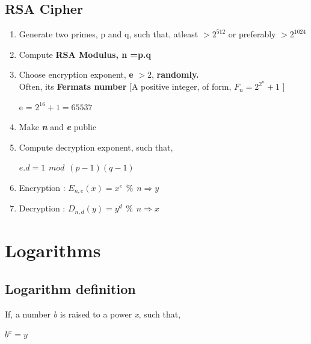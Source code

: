 \documentclass[12pt]{article}
\begin{document}
\subsection{RSA Cipher}
\begin{enumerate}
\item Generate two primes, p and q, such that, atleast $>2^{512}$ or preferably $>2^{1024}$
\item Compute \textbf{RSA Modulus, n =p.q}
\item Choose encryption exponent, \textbf{e} $> 2$, \textbf{randomly.} \\
Often, its \textbf{Fermats number} [A positive integer, of form, \textbf{$F_{n}=2^{2^{n}} + 1$} ]\\
\begin{center}
e = $2^{16} +1 = 65537$
\end{center}
\item Make \textbf{\textit{n}} and \textbf{\textit{e}} public
\item Compute decryption exponent, such that,\\
\begin{center}
$e.d = 1 \hspace{5pt} mod \hspace{5pt} (p-1)(q-1)$
\end{center}
\item Encryption : $E_{n,e}(x) = x ^{e} \hspace{5pt} \% \hspace{5pt}n \Rightarrow y $
\item Decryption : $D_{n,d}(y) = y ^{d} \hspace{5pt} \% \hspace{5pt}n \Rightarrow x $
\end{enumerate}







%
%
\pagebreak
\section{Logarithms}
\subsection{Logarithm definition}

If, a number \textit{b} is raised to a power \textit{x}, such that,\\
\begin{center}	$b^{x} = y$		\end{center}
\end{document}
